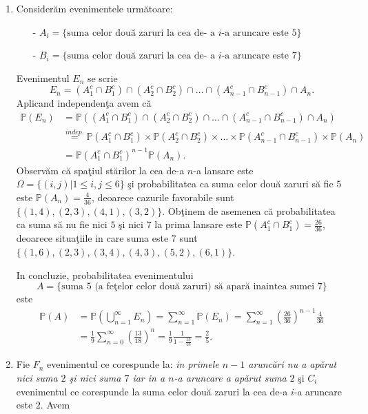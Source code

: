 \documentclass[]{article}
\def\Om{\Omega}
\def\PP{{\mathbb P}}
\begin{document}
\begin{enumerate}
\item Consider\u am evenimentele urm\u atoare: 
  \begin{itemize}
    \item[-] $A_i=\{\mbox{suma celor dou\u a zaruri la cea de- a $i$-a aruncare este $5$}\}$
    \item[-] $B_i=\{\mbox{suma celor dou\u a zaruri la cea de- a $i$-a aruncare este $7$}\}$
  \end{itemize}  
Evenimentul $E_n$ se scrie
    \begin{equation*}
        E_n = (A_1^c\cap B_1^c)\cap(A_2^c\cap B_2^c)\cap\dots\cap(A_{n-1}^c\cap B_{n-1}^c)\cap A_n.
    \end{equation*}
Aplicand independen\c ta avem c\u a
    \begin{align*}
        \PP(E_n) &= \PP((A_1^c\cap B_1^c)\cap(A_2^c\cap B_2^c)\cap\dots\cap(A_{n-1}^c\cap B_{n-1}^c)\cap A_n)\\
                 &\overset{indep.}{=} \PP(A_1^c\cap B_1^c)\times \PP(A_2^c\cap B_2^c)\times\dots\times \PP(A_{n-1}^c\cap B_{n-1}^c)\times \PP(A_n)\\
                 &= \PP(A_1^c\cap B_1^c)^{n-1}\PP(A_n).
    \end{align*}
Observ\u am c\u a spa\c tiul st\u arilor la cea de-a $n$-a lansare este $\Om=\{(i,j)|1\leq i,j\leq6\}$ \c si probabilitatea ca suma celor dou\u a zaruri s\u a fie $5$ este $\PP(A_n) = \frac{4}{36}$, deoarece cazurile favorabile sunt $\{(1,4),(2,3),(4,1),(3,2)\}$. Ob\c tinem de asemenea c\u a probabilitatea ca suma s\u a nu fie nici $5$ \c si nici $7$ la prima lansare este $\PP(A_1^c\cap B_1^c) = \frac{26}{36}$, deoarece situa\c tiile in care suma este $7$ sunt $\{(1,6),(2,3),(3,4),(4,3),(5,2),(6,1)\}$.
\par \noindent
In concluzie, probabilitatea evenimentului 
$$
  A=\{\mbox{suma $5$ (a fe\c telor celor dou\u a zaruri) s\u a apar\u a inaintea sumei $7$}\}
$$ 
este 
\begin{align*}
    \PP(A) &= \displaystyle\PP\left(\bigcup_{n=1}^{\infty}E_n\right)=\sum_{n=1}^{\infty}\PP(E_n)=\sum_{n=1}^{\infty}\left(\frac{26}{36}\right)^{n-1}\frac{4}{36}\\
            &= \frac{1}{9}\sum_{n=0}^{\infty}\left(\frac{13}{18}\right)^{n} = \frac{1}{9}\frac{1}{1-\frac{13}{18}}=\frac{2}{5}.
\end{align*}
\item Fie $F_n$ evenimentul ce corespunde la: \textit{in primele $n-1$ arunc\u ari nu a ap\u arut nici suma $2$ \c si nici suma $7$ iar in a $n$-a aruncare a ap\u arut suma $2$} \c si $C_i$ evenimentul ce corespunde la suma celor dou\u a zaruri la cea de-a $i$-a aruncare este $2$. Avem

\end{enumerate}
\end{document}
